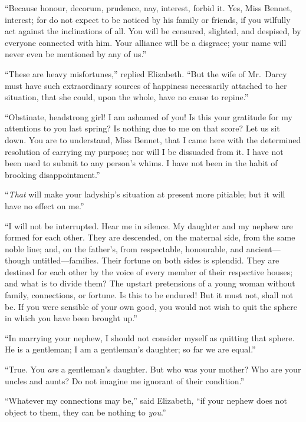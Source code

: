 \documentclass[12pt,english]{book}
\begin{document}
{}``Because honour, decorum, prudence, nay, interest, forbid it.
Yes, Miss Bennet, interest; for do not expect to be noticed by his
family or friends, if you wilfully act against the inclinations of
all. You will be censured, slighted, and despised, by everyone connected
with him. Your alliance will be a disgrace; your name will never even
be mentioned by any of us.''

{}``These are heavy misfortunes,'' replied Elizabeth. {}``But the
wife of Mr.\ Darcy must have such extraordinary sources of happiness
necessarily attached to her situation, that she could, upon the whole,
have no cause to repine.''

{}``Obstinate, headstrong girl! I am ashamed of you! Is this your
gratitude for my attentions to you last spring? Is nothing due to
me on that score? Let us sit down. You are to understand, Miss Bennet,
that I came here with the determined resolution of carrying my purpose;
nor will I be dissuaded from it. I have not been used to submit to
any person's whims. I have not been in the habit of brooking disappointment.''

{}``\textit{That} will make your ladyship's situation at present
more pitiable; but it will have no effect on me.''

{}``I will not be interrupted. Hear me in silence. My daughter and
my nephew are formed for each other. They are descended, on the maternal
side, from the same noble line; and, on the father's, from respectable,
honourable, and ancient\mbox{---}though untitled\mbox{--}--families.
Their fortune on both sides is splendid. They are destined for each
other by the voice of every member of their respective houses; and
what is to divide them? The upstart pretensions of a young woman without
family, connections, or fortune. Is this to be endured! But it must
not, shall not be. If you were sensible of your own good, you would
not wish to quit the sphere in which you have been brought up.''

{}``In marrying your nephew, I should not consider myself as quitting
that sphere. He is a gentleman; I am a gentleman's daughter; so far
we are equal.''

{}``True. You \textit{are} a gentleman's daughter. But who was your
mother? Who are your uncles and aunts? Do not imagine me ignorant
of their condition.''

{}``Whatever my connections may be,'' said Elizabeth, {}``if your
nephew does not object to them, they can be nothing to \textit{you}.''
\end{document}
